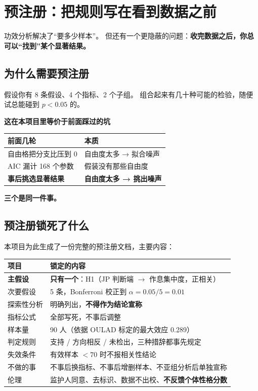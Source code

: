 \documentclass[UTF8,a4paper,11pt]{ctexart}
\newenvironment{explainbox}[1]
{\begin{center}\begin{minipage}{0.94\textwidth}\colorbox{boxbg}{\parbox{0.92\textwidth}{\textbf{#1}\par\vspace{2pt}}}}
{\end{minipage}\end{center}}
\begin{document}
\newpage

\section{预注册：把规则写在看到数据之前}

功效分析解决了“要多少样本”。
但还有一个更隐蔽的问题：\textbf{收完数据之后，你总可以“找到”某个显著结果。}

\subsection{为什么需要预注册}

假设你有 8 条假设、4 个指标、2 个子组。
组合起来有几十种可能的检验，随便试总能碰到 $p < 0.05$ 的。

\begin{explainbox}{这在本项目里等价于前面踩过的坑}
\begin{center}
\begin{tabular}{p{6.4cm}p{6.0cm}}
\toprule
\textbf{前面几轮} & \textbf{本质} \\
\midrule
自由格把分支比压到 0 & 自由度太多 → 拟合噪声 \\
AIC 漏计 168 个参数 & 假装没有那些自由度 \\
\textbf{事后挑选显著结果} & \textbf{自由度太多 → 挑出噪声} \\
\bottomrule
\end{tabular}
\end{center}
\textbf{三个是同一件事。}
\end{explainbox}

\subsection{预注册锁死了什么}

本项目为此生成了一份完整的预注册文档，主要内容：

\begin{longtable}{@{}p{3.2cm}p{10.6cm}@{}}
\toprule
\textbf{项目} & \textbf{锁定的内容} \\
\midrule
\textbf{主假设} & \textbf{只有一个}：H1（JP 判断端 $\to$ 作息集中度，正相关） \\
次要假设 & 5 条，Bonferroni 校正到 $\alpha = 0.05/5 = 0.01$ \\
探索性分析 & 明确列出，\textbf{不得作为结论宣称} \\
指标公式 & 全部写死，不事后调整 \\
样本量 & 90 人（依据 OULAD 标定的最大效应 0.289） \\
判定规则 & 支持 / 方向相反 / 未检出，三种措辞都事先规定 \\
失效条件 & 有效样本 $<70$ 时不报相关性结论 \\
不做的事 & 不事后换指标、不事后增删样本、不亚组分析后单独宣称 \\
伦理 & 监护人同意、去标识、数据不出校、\textbf{不反馈个体性格分数} \\
\bottomrule
\end{longtable}
\end{document}
